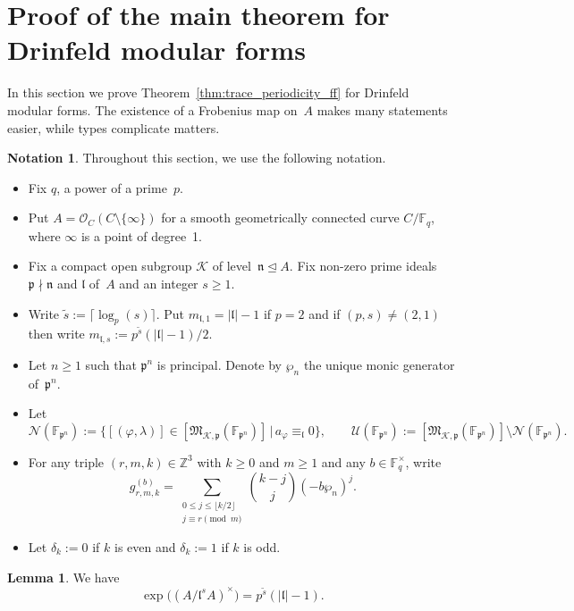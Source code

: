 \documentclass[10pt]{article}
\theoremstyle{definition}
\newtheorem{lemma}[theorem]{Lemma}
\newtheorem{notation}[theorem]{Notation}
\let\phi\varphi
\renewcommand{\:}{\colon}
\newcommand{\bF}{\mathbb{F}}
\renewcommand{\l}{\mathfrak{l}}
\begin{document}
\section{Proof of the main theorem for Drinfeld modular forms}\label{sec:ff-proof}
In this section we prove Theorem~\ref{thm:trace_periodicity_ff} for Drinfeld modular forms. The existence of a Frobenius map on~$A$ makes many statements easier, while types complicate matters.

\begin{notation} Throughout this section, we use the following notation.
    \begin{itemize}
    \item Fix $q$, a power of a prime~$p$. 
    \item Put $A = \mathcal O_C(C \setminus \{\infty\})$ for a smooth geometrically connected curve $C/\bF_q$, where $\infty$ is a point of degree~1. 
    \item Fix a compact open subgroup ${\mathcal K}$ of level~$\mathfrak n \trianglelefteq A$. 
     Fix non-zero prime ideals $\mathfrak p \nmid \mathfrak n$ and $\mathfrak l$ of~$A$ and an integer $s \geq 1$.
        \item Write $\tilde{s} := \lceil \log_p(s) \rceil$. Put $m_{\l,1} = |\l|-1$ if $p=2$ and if $(p,s) \neq (2,1)$ then write $m_{\l,s} := p^{\tilde{s}} (|\l|-1)/2$.
        \item Let $n \geq 1$ such that $\mathfrak p^n$ is principal. Denote by $\wp_n$ the unique monic generator of~$\mathfrak p^n$.
        \item Let
        \[
    \mathcal N(\bF_{\mathfrak p^n}) := \{ [(\phi,\lambda)] \in [\mathfrak M_{{\mathcal K},\mathfrak p}(\bF_{\mathfrak p^n})] \, | \, a_{\phi} \equiv_\l 0 \}, 
\qquad 
    \mathcal U(\bF_{\mathfrak p^n}) := [\mathfrak M_{{\mathcal K},\mathfrak p}(\bF_{\mathfrak p^n})] \setminus \mathcal N(\bF_{\mathfrak p^n}).
\]
        \item For any triple $(r,m,k) \in \mathbb Z^3$ with $k \geq 0$ and $m\geq 1$ and any $b \in \mathbb F_q^\times$, write
        \[
        g^{(b)}_{r,m,k} = \sum_{\substack{0 \leq j \leq \lfloor k/2 \rfloor \\ j \equiv r \pmod{m}}} \binom{k-j}{j} (-b\wp_n)^j.
        \]
\item 
Let $\delta_k := 0$ if $k$ is even and $\delta_k := 1$ if $k$ is odd.
    \end{itemize}
\end{notation}

\begin{lemma} \label{lem-exp}
    We have 
    \[
    \exp\bigl((A/\l^sA)^\times \bigr) = p^{\tilde{s}}(|\l|-1).
    \]
\end{lemma}
\end{document}
